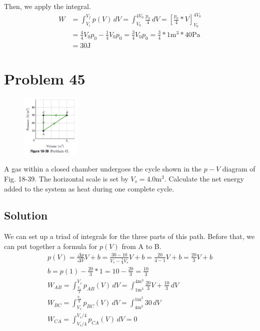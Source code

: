 \documentclass[12pt]{article}
\begin{document}
            Then, we apply the integral. 
            \begin{align}
                W   &=  \int_{V_i}^{V_f} p(V) \,dV 
                    =   \int_{V_0}^{4V_0} \frac{p_0}{4} \,dV
                    =   \left[ \frac{p_0}{4}*V \right]_{V_0}^{4V_0}\\
                    &=  \frac{4}{4} V_0 p_0 - \frac{1}{4} V_0 p_0
                    =   \frac{3}{4} V_0 p_0
                    =   \frac{3}{4} * 1 \unit{\meter^3} * 40 \unit{\pascal}\\
                    &=  \boxed{30 \unit{\joule}}
            \end{align}
        

    \pagebreak
    \section{Problem 45}
        \begin{figure}
            \vspace{-30pt}
            \includegraphics[width=0.25\textwidth]{picture_18-39.png} 
        \end{figure}
        A gas within a closed chamber undergoes the cycle shown in the $p-V$ diagram of Fig. 18-39. 
        The horizontal scale is set by $V_s = 4.0 \unit{\meter^3}$. 
        Calculate the net energy added to the system as heat during one complete cycle.

        \subsection{Solution}
        We can set up a triad of integrals for the three parts of this path.
        Before that, we can put together a formula for $p(V)$ from A to B.
        \begin{gather}
            p(V)    =   \frac{\Delta p}{\Delta V}V + b  =   \frac{30 - 10}{V_s - \frac{1}{4}V_s}V + b   =   \frac{20}{4 - 1}V + b   =   \frac{20}{3}V + b\\
            b   =   p(1) - \frac{20}{3} * 1 =   10 - \frac{20}{3}   =   \frac{10}{3}\\
            W_{AB}  =   \int_{\frac{V_s}{4}}^{V_s} p_{AB}(V) \,dV   =   \int_{1\unit{\meter^3}}^{4\unit{\meter^3}} \frac{20}{3}V + \frac{10}{3} \,dV\\
            W_{BC}  =   \int_{V_s}^{\frac{V_s}{4}} p_{BC}(V) \,dV   =   \int_{4\unit{\meter^3}}^{1\unit{\meter^3}} 30 \,dV\\
            W_{CA}  =   \int_{V_s/4}^{V_s/4} p_{CA}(V) \,dV =   0
        \end{gather}
\end{document}
